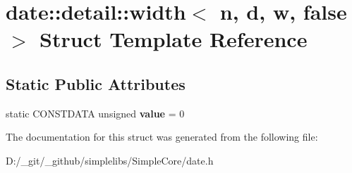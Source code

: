 \hypertarget{structdate_1_1detail_1_1width_3_01n_00_01d_00_01w_00_01false_01_4}{}\section{date\+::detail\+::width$<$ n, d, w, false $>$ Struct Template Reference}
\label{structdate_1_1detail_1_1width_3_01n_00_01d_00_01w_00_01false_01_4}
\subsection*{Static Public Attributes}
\begin{DoxyCompactItemize}
\item 
\mbox{\label{structdate_1_1detail_1_1width_3_01n_00_01d_00_01w_00_01false_01_4_a61558ddcb9c4dc69bd467ed74e259dd4}} 
static C\+O\+N\+S\+T\+D\+A\+TA unsigned {\bfseries value} = 0
\end{DoxyCompactItemize}


The documentation for this struct was generated from the following file\+:\begin{DoxyCompactItemize}
\item 
D\+:/\+\_\+git/\+\_\+github/simplelibs/\+Simple\+Core/date.\+h\end{DoxyCompactItemize}
